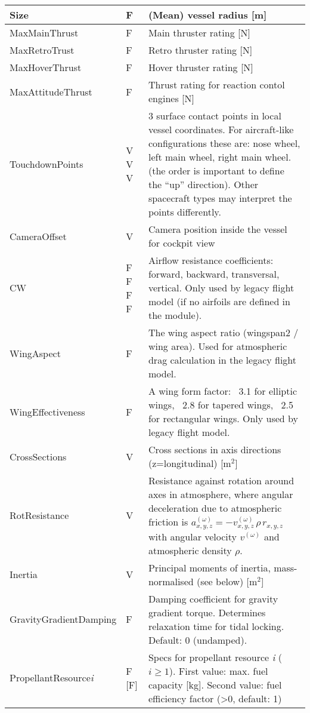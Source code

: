 \documentclass[Orbiter Developer Manual.tex]{subfiles}
\begin{document}
\begin{longtable}{ |p{}|p{}|p{}| }
	Size & F & (Mean) vessel radius [m]\\
	\hline\rule{0pt}{2ex}
	MaxMainThrust & F & Main thruster rating [N]\\
	\hline\rule{0pt}{2ex}
	MaxRetroTrust & F & Retro thruster rating [N]\\
	\hline\rule{0pt}{2ex}
	MaxHoverThrust & F & Hover thruster rating [N]\\
	\hline\rule{0pt}{2ex}
	MaxAttitudeThrust & F & Thrust rating for reaction contol engines [N]\\
	\hline\rule{0pt}{2ex}
	TouchdownPoints & V V V & 3 surface contact points in local vessel coordinates. For aircraft-like configurations these are: nose wheel, left main wheel, right main wheel. (the order is important to define the “up” direction). Other spacecraft types may interpret the points differently.\\
	\hline\rule{0pt}{2ex}
	CameraOffset & V & Camera position inside the vessel for cockpit view\\
	\hline\rule{0pt}{2ex}
	CW & F F F F & Airflow resistance coefficients: forward, backward, transversal, vertical. Only used by legacy flight model (if no airfoils are defined in the module).\\
	\hline\rule{0pt}{2ex}
	WingAspect & F & The wing aspect ratio (wingspan2 / wing area). Used for atmospheric drag calculation in the legacy flight model.\\
	\hline\rule{0pt}{2ex}
	WingEffectiveness & F & A wing form factor: ~3.1 for elliptic wings, ~2.8 for tapered wings, ~2.5 for rectangular wings. Only used by legacy flight model.\\
	\hline\rule{0pt}{2ex}
	CrossSections & V & Cross sections in axis directions (z=longitudinal) [m$^{2}$]\\
	\hline\rule{0pt}{2ex}
	RotResistance & V & Resistance against rotation around axes in atmosphere, where angular deceleration due to atmospheric friction is $a_{x,y,z}^{(\omega)} = -v_{x,y,z}^{(\omega)} \, \rho \, r_{x,y,z}$ with angular velocity $v^{(\omega)}$ and atmospheric density $\rho$.\\
	\hline\rule{0pt}{2ex}
	Inertia & V & Principal moments of inertia, mass-normalised (see below) [m$^{2}$]\\
	\hline\rule{0pt}{2ex}
	GravityGradientDamping & F & Damping coefficient for gravity gradient torque. Determines relaxation time for tidal locking. Default: 0 (undamped).\\
	\hline\rule{0pt}{2ex}
	PropellantResource\textit{i} & F [F] & Specs for propellant resource \textit{i} ($i \geq 1$). First value: max. fuel capacity [kg]. Second value: fuel efficiency factor (>0, default: 1)\\

\end{longtable}
\end{document}
